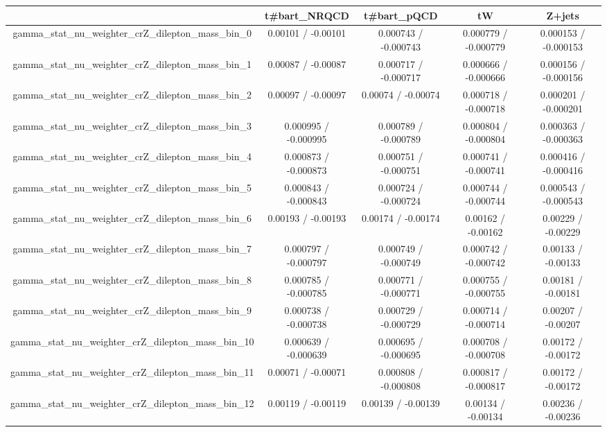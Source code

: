 \documentclass[10pt]{article}
\begin{document}
\begin{table}[htbp]
\begin{center}
\begin{tabular}{|c|c|c|c|c|}
\hline 
      & t#bar{t}_{NRQCD}      & t#bar{t}_{pQCD}      & tW      & Z+jets \\ 
\hline 
  gamma_stat_nu_weighter_crZ_dilepton_mass_bin_0 & 0.00101 / -0.00101 & 0.000743 / -0.000743 & 0.000779 / -0.000779 & 0.000153 / -0.000153 \\ 
  gamma_stat_nu_weighter_crZ_dilepton_mass_bin_1 & 0.00087 / -0.00087 & 0.000717 / -0.000717 & 0.000666 / -0.000666 & 0.000156 / -0.000156 \\ 
  gamma_stat_nu_weighter_crZ_dilepton_mass_bin_2 & 0.00097 / -0.00097 & 0.00074 / -0.00074 & 0.000718 / -0.000718 & 0.000201 / -0.000201 \\ 
  gamma_stat_nu_weighter_crZ_dilepton_mass_bin_3 & 0.000995 / -0.000995 & 0.000789 / -0.000789 & 0.000804 / -0.000804 & 0.000363 / -0.000363 \\ 
  gamma_stat_nu_weighter_crZ_dilepton_mass_bin_4 & 0.000873 / -0.000873 & 0.000751 / -0.000751 & 0.000741 / -0.000741 & 0.000416 / -0.000416 \\ 
  gamma_stat_nu_weighter_crZ_dilepton_mass_bin_5 & 0.000843 / -0.000843 & 0.000724 / -0.000724 & 0.000744 / -0.000744 & 0.000543 / -0.000543 \\ 
  gamma_stat_nu_weighter_crZ_dilepton_mass_bin_6 & 0.00193 / -0.00193 & 0.00174 / -0.00174 & 0.00162 / -0.00162 & 0.00229 / -0.00229 \\ 
  gamma_stat_nu_weighter_crZ_dilepton_mass_bin_7 & 0.000797 / -0.000797 & 0.000749 / -0.000749 & 0.000742 / -0.000742 & 0.00133 / -0.00133 \\ 
  gamma_stat_nu_weighter_crZ_dilepton_mass_bin_8 & 0.000785 / -0.000785 & 0.000771 / -0.000771 & 0.000755 / -0.000755 & 0.00181 / -0.00181 \\ 
  gamma_stat_nu_weighter_crZ_dilepton_mass_bin_9 & 0.000738 / -0.000738 & 0.000729 / -0.000729 & 0.000714 / -0.000714 & 0.00207 / -0.00207 \\ 
  gamma_stat_nu_weighter_crZ_dilepton_mass_bin_10 & 0.000639 / -0.000639 & 0.000695 / -0.000695 & 0.000708 / -0.000708 & 0.00172 / -0.00172 \\ 
  gamma_stat_nu_weighter_crZ_dilepton_mass_bin_11 & 0.00071 / -0.00071 & 0.000808 / -0.000808 & 0.000817 / -0.000817 & 0.00172 / -0.00172 \\ 
  gamma_stat_nu_weighter_crZ_dilepton_mass_bin_12 & 0.00119 / -0.00119 & 0.00139 / -0.00139 & 0.00134 / -0.00134 & 0.00236 / -0.00236 \\ 

\end{tabular}
\end{center}
\end{table}
\end{document}
